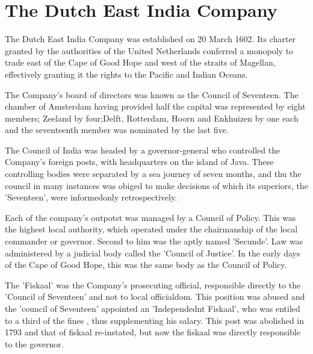 \chapter{The Dutch East India Company}

The Dutch East India Company was established on 20 March 1602. 
Its charter granted by the authorities of the United Netherlands 
conferred a monopoly to trade east of the Cape of Good Hope and 
west of the straits of Magellan, effectively granting it the rights to the 
Pacific and Indian Oceans.



 


The Company's board of directors was known as the Council of Seventeen. 
The chamber of Amsterdam having provided half the capital 
was represented by eight members; Zeeland by four;Delft, 
Rotterdam, Hoorn and Enkhuizen by one each and the seventeenth 
member was nominated by the last five.

The Council of India was headed by a governor-general who controlled 
the Company's foreign posts, with headquarters on the island of Java. 
These controlling bodies were separated by a sea journey of seven months, 
and thu the council in many instances was obiged to make decisions of 
which its superiors, the 'Seventeen', were informedonly retrospectively.

Each of the company's outpotst was managed by a Council of Policy. 
This was the highest local authority, which operated under the 
chairmanship of the local commander or governor. Second to him 
was the aptly named 'Secunde'. Law was administered by a judicial 
body called the 'Council of Justice'. In the early days of the 
Cape of Good Hope, this was the same body as the Council of Policy.

The 'Fiskaal' was the Company's prosecuting official, responsible 
directly to the 'Council of Seventeen' and not to local officialdom. 
This position was abused and the 'council of Seventeen' appointed an 
'Independednt Fiskaal', who was entiled to a third of the fines , 
thus supplementing his salary. This post was abolished in 1793 and 
that of fiskaal re-instated, but now the fiskaal was directly 
responsible to the governor.

